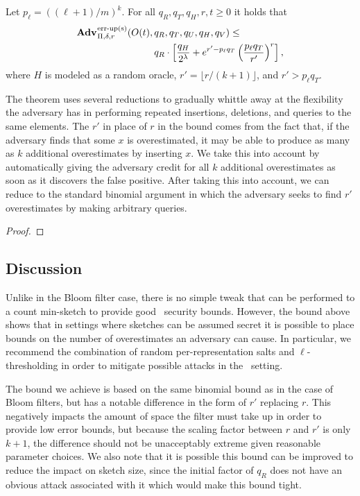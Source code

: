 \begin{theorem}\label{thm:scms-erreps-th}
Let $p_\ell = ((\ell+1)/m)^k$. For all $q_R, q_T, q_H, r, t \geq 0$
it holds that
  \begin{equation*}
  \begin{aligned}
    \Adv{\erreps}_{\Pi,\delta,r}(O(t),\,&q_R,q_T,q_U,q_H,q_V) \leq \\
     & q_R \cdot \left[\frac{q_H}{2^\lambda} + e^{r'-p_\ell q_T}\left(\frac{p_\ell q_T}{r'}\right)^r\right],
  \end{aligned}
\end{equation*}
where $H$ is modeled as a random oracle, $r' = \lfloor r/(k+1) \rfloor$, and $r'
> p_\ell q_T$.
\end{theorem}

The theorem uses several reductions to gradually whittle away at the flexibility
the adversary has in performing repeated insertions, deletions, and queries to
the same elements. The $r'$ in place of $r$ in the bound comes from the fact
that, if the adversary finds that some $x$ is overestimated, it may be able to
produce as many as $k$ additional overestimates by inserting $x$. We take this
into account by automatically giving the adversary credit for all $k$ additional
overestimates as soon as it discovers the false positive. After taking this into
account, we can reduce to the standard binomial argument in which the adversary
seeks to find $r'$ overestimates by making arbitrary queries.

\begin{proof}
  
\end{proof}

\subsection{Discussion}

Unlike in the Bloom filter case, there is no simple tweak that can be performed
to a count min-sketch to provide good \errep\ security bounds. However, the
bound above shows that in settings where sketches can be assumed secret it is
possible to place bounds on the number of overestimates an adversary can cause.
In particular, we recommend the combination of random per-representation salts
and $\ell$-thresholding in order to mitigate possible attacks in the \erreps\
setting.

The bound we achieve is based on the same binomial bound as in the case of Bloom
filters, but has a notable difference in the form of $r'$ replacing $r$. This
negatively impacts the amount of space the filter must take up in order to
provide low error bounds, but because the scaling factor between $r$ and $r'$ is
only $k+1$, the difference should not be unacceptably extreme given reasonable
parameter choices. We also note that it is possible this bound can be improved
to reduce the impact on sketch size, since the initial factor of $q_R$ does not
have an obvious attack associated with it which would make this bound tight.
